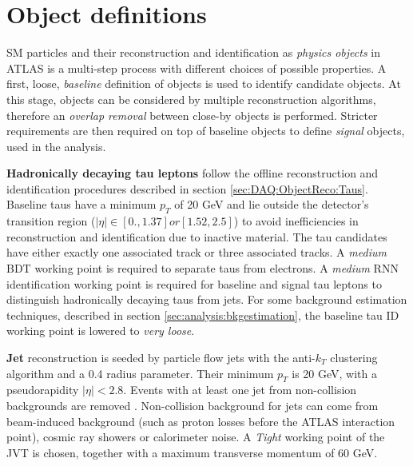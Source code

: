 \section{Object definitions}
\label{sec:analysis:objectDef}
\ac{SM} particles and their reconstruction and identification as \textit{physics objects} in ATLAS is a multi-step process with different choices of possible properties. 
A first, loose,  \textit{baseline} definition of objects is used to identify candidate objects.  At this stage, objects can be considered by multiple reconstruction algorithms, therefore an \textit{overlap removal} between close-by objects is performed.  Stricter requirements are then required on top of baseline objects to define \textit{signal} objects, used in the analysis.

\textbf{Hadronically decaying tau leptons} follow the offline reconstruction and identification procedures described in section \ref{sec:DAQ:ObjectReco:Taus}.  Baseline taus have a minimum $p_T$ of 20 GeV and lie outside the detector's transition region ($|\eta| \in [0.,1.37] or [1.52, 2.5]$) to avoid inefficiencies in reconstruction and identification due to inactive material.  The tau candidates have either exactly one associated track or three associated tracks.  A \textit{medium} \ac{BDT} working point is required to separate taus from electrons.  A \textit{medium} \ac{RNN} identification working point is required for baseline and signal tau leptons to distinguish  hadronically decaying taus from jets.  For some background estimation techniques,  described in section \ref{sec:analysis:bkgestimation},  the baseline tau ID working point is lowered to \textit{very loose}. 

\textbf{Jet} reconstruction is seeded by particle flow jets with the anti-$k_T$ clustering algorithm and a 0.4 radius parameter. Their minimum $p_T$ is 20 GeV,  with a pseudorapidity $|\eta| <2.8$.  Events with at least one jet from non-collision backgrounds are removed \cite{JetCleaning}.  Non-collision background for jets can come from beam-induced background (such as proton losses before the ATLAS interaction point), cosmic ray showers or calorimeter noise.  A \textit{Tight} working point of the \ac{JVT} is chosen, together with a maximum transverse momentum of 60 GeV.%

